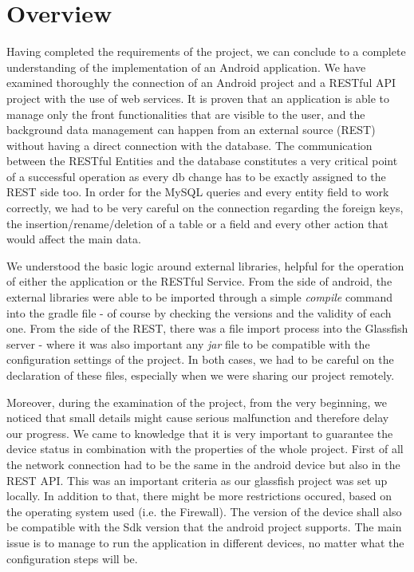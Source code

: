 \documentclass[12pt]{article}
\begin{document}
	\section{Overview}
    Having completed the requirements of the project, we can conclude to a complete understanding of the implementation of an Android application. We have examined thoroughly the connection of an Android project and a RESTful API project with the use of web services. It is proven that an application is able to manage only the front functionalities that are visible to the user, and the background data management can happen from an external source (REST) without having a direct connection with the database. The communication between the RESTful Entities and the database constitutes a very critical point of a successful operation as every db change has to be exactly assigned to the REST side too. In order for the MySQL queries and every entity field to work correctly, we had to be very careful on the connection regarding the foreign keys, the insertion/rename/deletion of a table or a field and every other action that would affect the main data.
    
    We understood the basic logic around external libraries, helpful for the operation of either the application or the RESTful Service. From the side of android, the external libraries were able to be imported through a simple \textit{compile} command into the gradle file - of course by checking the versions and the validity of each one. From the side of the REST, there was a file import process into the Glassfish server - where it was also important any \textit{jar} file to be compatible with the configuration settings of the project. In both cases, we had to be careful on the declaration of these files, especially when we were sharing our project remotely.

    Moreover, during the examination of the project, from the very beginning, we noticed that small details might cause serious malfunction and therefore delay our progress. We came to knowledge that it is very important to guarantee the device status in combination with the properties of the whole project. First of all the network connection had to be the same in the android device but also in the REST API. This was an important criteria as our glassfish project was set up locally. In addition to that, there might be more restrictions occured, based on the operating system used (i.e. the Firewall). The version of the device shall also be compatible with the Sdk version that the android project supports. The main issue is to manage to run the application in different devices, no matter what the configuration steps will be.
    
\end{document}
